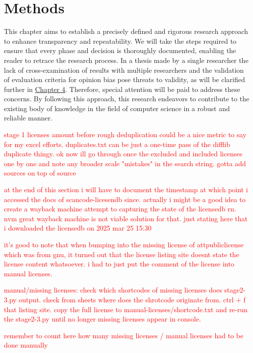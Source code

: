 \chapter{Methods\label{methods}}
This chapter aims to establish a precisely defined and rigorous research approach to enhance transparency and repeatability. We will take the steps required to ensure that every phase and decision is thoroughly documented, enabling the reader to retrace the research process. In a thesis made by a single researcher the lack of cross-examination of results with multiple researchers and the validation of evaluation criteria for opinion bias pose threats to validity, as will be clarified further in \hyperref[discussion]{Chapter 4}. Therefore, special attention will be paid to address these concerns. By following this approach, this research endeavors to contribute to the existing body of knowledge in the field of computer science in a robust and reliable manner.

\textcolor{red}{stage 1 licenses amount before rough deduplication could be a nice metric to say for my excel efforts. duplicates.txt can be just a one-time pass of the difflib duplicate thingy. ok now ill go through once the excluded and included licenses one by one and note any broader scale "mistakes" in the search string. gotta add sources on top of source}

\textcolor{red}{at the end of this section i will have to document the timestamp at which point i accessed the docs of scancode-licesendb since. actually i might be a good idea to create a wayback machine attempt to capturing the state of the licensedb rn. nvm great wayback machine is not viable solution for that. just stating here that i downloaded the licensedb on 2025 mar 25 15:30}

\textcolor{red}{it's good to note that when bumping into the missing license of attpubliclicense which was from gnu, it turned out that the license listing site doesnt state the license content whatsoever. i had to just put the comment of the license into manual licenses.}

\textcolor{red}{manual/missing licenses: check which shortcodes of missing licenses does stage2-3.py output. check from sheets where does the shrotcode originate from. ctrl + f that listing site. copy the full license to manual-licenses/shortcode.txt and re-run the stage2-3.py until no longer missing licenses appear in console.}

\textcolor{red}{remember to count here how many missing licenses / manual licenses had to be done manually}


